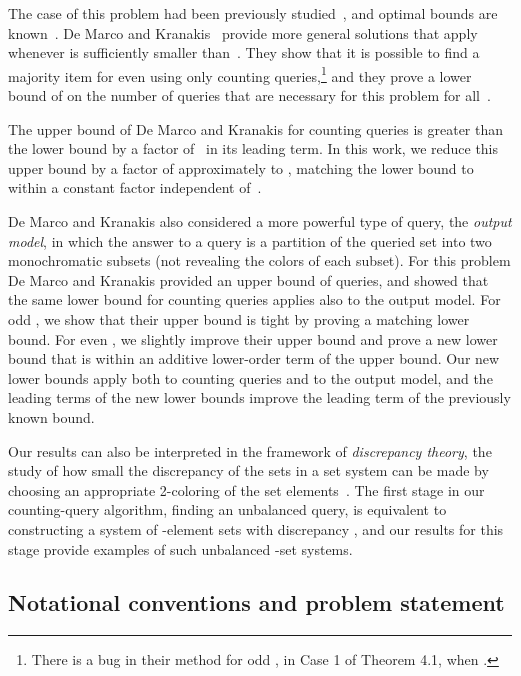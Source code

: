 \documentclass[11pt]{llncs}
\begin{document}
The case  of this problem had been previously studied~\cite{AloReiSch-IPL-93,AloReiSch-SJC-97,SakWer-Comb-91}, and optimal bounds are known~\cite{AloReiSch-IPL-93,SakWer-Comb-91}.
De Marco and Kranakis~\cite{DeMKra-DMAA-15} provide more general solutions that apply whenever  is sufficiently smaller than~. They show that it is possible to find a majority item for even  using only  counting queries,\footnote{There is a bug in their method for odd , in Case 1 of Theorem 4.1, when .} and they prove a lower bound of  on the number of queries that are necessary for this problem for all~.

The upper bound of De Marco and Kranakis for counting queries is greater than the lower bound by a factor of~ in its leading term. In this work, we reduce this upper bound by a factor of approximately  to , matching the lower bound to within a constant factor independent of~. 

De Marco and Kranakis also considered a more powerful type of query, the \emph{output model}, in which the answer to a query is a partition of the queried set into two monochromatic subsets (not revealing the colors of each subset). For this problem De Marco and Kranakis provided an upper bound of  queries, and showed that the same  lower bound for counting queries applies also to the output model. For odd , we show that their upper bound is tight by proving a matching lower bound. For even , we slightly improve their upper bound and prove a new lower bound that is within an additive  lower-order term of the upper bound. Our new lower bounds apply both to counting queries and to the output model, and the  leading terms of the new lower bounds improve the  leading term of the previously known bound.

Our results can also be interpreted in the framework of \emph{discrepancy theory}, the study of how small the discrepancy of the sets in a set system can be made by choosing an appropriate 2-coloring of the set elements~\cite{BecChe-08}. The first stage in our counting-query algorithm, finding an unbalanced query, is equivalent to constructing a system of -element sets with discrepancy , and our results for this stage provide examples of such unbalanced -set systems.

\subsection{Notational conventions and problem statement}
\end{document}
